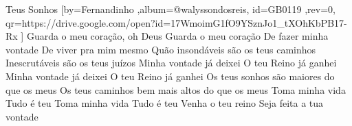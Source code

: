 \beginsong
{Teus Sonhos %
}[by={Fernandinho %
},album={@walyssondosreis},
id={GB0119 %
},rev={0}, %
qr={https://drive.google.com/open?id=17WmoimG1fO9YSznJo1_tXOhKbPB17-Rx %
}]
\beginverse*
Guarda o meu coração, oh Deus
Guarda o meu coração
De fazer minha vontade
De viver pra mim mesmo
\endverse
\beginverse*
Quão insondáveis são os teus caminhos
Inescrutáveis são os teus juízos
\endverse
\beginverse*
Minha vontade já deixei
O teu Reino já ganhei
Minha vontade já deixei
O teu Reino já ganhei
\endverse
\beginchorus
Os teus sonhos são maiores do que os meus
Os teus caminhos bem mais altos do que os meus
Toma minha vida
Tudo é teu
Toma minha vida
Tudo é teu
\endchorus
\beginverse*
Venha o teu reino
Seja feita a tua vontade
\endverse

